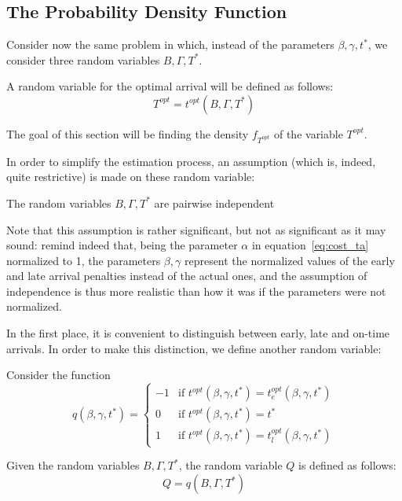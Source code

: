 \subsection{The Probability Density Function}

Consider now the same problem in which,
instead of the parameters \(\beta, \gamma, t^*\),
we consider three random variables \(B, \Gamma, T^*\).

A random variable for the optimal arrival will be defined as follows:
\begin{equation}
  \label{eq:rv-opt-arr}
  T^{opt} = t^{opt}(B, \Gamma, T^*)
\end{equation}

The goal of this section will be finding the density \(f_{T^{opt}}\) of the variable \(T^{opt}\).

In order to simplify the estimation process, an assumption (which is, indeed, quite restrictive)
is made on these random variable:

\begin{assumption}
  The random variables \(B, \Gamma, T^*\) are pairwise independent
\end{assumption}

Note that this assumption is rather significant,
but not as significant as it may sound:
remind indeed that, being the parameter \(\alpha\) in equation~\eqref{eq:cost_ta} normalized to 1,
the parameters \(\beta, \gamma\) represent the normalized values of the early and late arrival penalties instead of the actual ones,
and the assumption of independence is thus more realistic than how it was if the parameters were not normalized.

In the first place,
 it is convenient to distinguish between early, late and on-time arrivals.
In order to make this distinction, we define another random variable:
\begin{definition}
  Consider the function
  \begin{equation*}
    q(\beta, \gamma, t^*) =
    \begin{cases}
      -1 & \text{if } t^{opt}(\beta, \gamma, t^*) = t_e^{opt}(\beta, \gamma, t^*) \\
      0 & \text{if } t^{opt}(\beta, \gamma, t^*) = t^* \\
      1 & \text{if } t^{opt}(\beta, \gamma, t^*) = t_l^{opt}(\beta, \gamma, t^*)
    \end{cases}
  \end{equation*}

  Given the random variables \(B, \Gamma, T^*\), the random variable \(Q\) is defined as follows:
  \begin{equation*}
    Q  = q(B, \Gamma, T^*)
  \end{equation*}
\end{definition}

